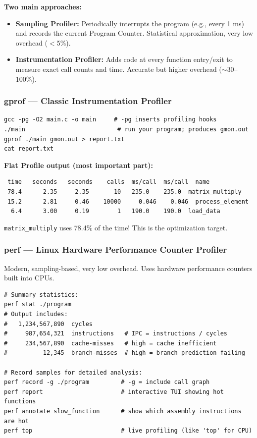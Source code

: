 \documentclass[11pt,a4paper]{article}
\newcommand{\code}[1]{\texttt{\small\colorbox{codebg}{\color{codekw}#1}}}
\newcommand{\term}[1]{\textbf{\color{darkblue}#1}}
\begin{document}
\textbf{Two main approaches:}
\begin{itemize}[noitemsep]
  \item \term{Sampling Profiler:} Periodically interrupts the program (e.g., every 1 ms) and records the current Program Counter. Statistical approximation, very low overhead ($<$5\%).
  \item \term{Instrumentation Profiler:} Adds code at every function entry/exit to measure exact call counts and time. Accurate but higher overhead ($\sim$30--100\%).
\end{itemize}

\subsubsection{gprof --- Classic Instrumentation Profiler}

\begin{lstlisting}[style=bashstyle]
gcc -pg -O2 main.c -o main     # -pg inserts profiling hooks
./main                          # run your program; produces gmon.out
gprof ./main gmon.out > report.txt
cat report.txt
\end{lstlisting}

\textbf{Flat Profile output (most important part):}
\begin{lstlisting}[style=bashstyle]
  %   cumulative   self              self     total
 time   seconds   seconds    calls  ms/call  ms/call  name
 78.4      2.35     2.35       10   235.0    235.0  matrix_multiply
 15.2      2.81     0.46    10000     0.046    0.046  process_element
  6.4      3.00     0.19        1   190.0    190.0  load_data
\end{lstlisting}

\code{matrix\_multiply} uses 78.4\% of the time! This is the optimization target.

\subsubsection{perf --- Linux Hardware Performance Counter Profiler}

Modern, sampling-based, very low overhead. Uses hardware performance counters built into CPUs.

\begin{lstlisting}[style=bashstyle]
# Summary statistics:
perf stat ./program
# Output includes:
#   1,234,567,890  cycles
#     987,654,321  instructions   # IPC = instructions / cycles
#     234,567,890  cache-misses   # high = cache inefficient
#          12,345  branch-misses  # high = branch prediction failing

# Record samples for detailed analysis:
perf record -g ./program         # -g = include call graph
perf report                      # interactive TUI showing hot functions
perf annotate slow_function      # show which assembly instructions are hot
perf top                         # live profiling (like 'top' for CPU)
\end{lstlisting}
\end{document}
